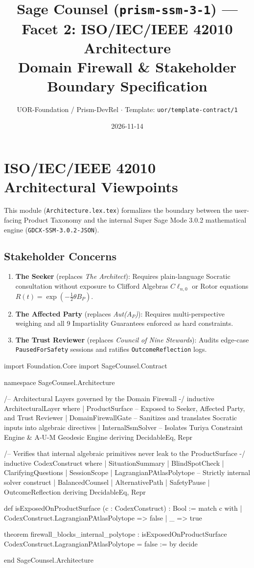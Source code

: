 \documentclass[11pt,a4paper]{article}
\title{Sage Counsel (\texttt{prism-ssm-3-1}) --- Facet 2: ISO/IEC/IEEE 42010 Architecture\\
\small Domain Firewall \& Stakeholder Boundary Specification}
\author{UOR-Foundation / Prism-DevRel $\cdot$ Template: \texttt{uor/template-contract/1}}
\date{2026-11-14}
\begin{document}
\maketitle

\section{ISO/IEC/IEEE 42010 Architectural Viewpoints}
This module (\texttt{Architecture.lex.tex}) formalizes the boundary between the user-facing Product Taxonomy and the internal Super Sage Mode 3.0.2 mathematical engine (\texttt{GDCX-SSM-3.0.2-JSON}).

\subsection{Stakeholder Concerns}
\begin{enumerate}
  \item \textbf{The Seeker} (replaces \emph{The Architect}): Requires plain-language Socratic consultation without exposure to Clifford Algebras $C\ell_{n,0}$ or Rotor equations $R(t) = \exp(-\frac{1}{2}\theta B_P)$.
  \item \textbf{The Affected Party} (replaces \emph{Aut($A_P$)}): Requires multi-perspective weighing and all 9 Impartiality Guarantees enforced as hard constraints.
  \item \textbf{The Trust Reviewer} (replaces \emph{Council of Nine Stewards}): Audits edge-case \texttt{PausedForSafety} sessions and ratifies \texttt{OutcomeReflection} logs.
\end{enumerate}

\begin{code}
import Foundation.Core
import SageCounsel.Contract

namespace SageCounsel.Architecture

/-- Architectural Layers governed by the Domain Firewall -/
inductive ArchitecturalLayer where
  | ProductSurface     -- Exposed to Seeker, Affected Party, and Trust Reviewer
  | DomainFirewallGate -- Sanitizes and translates Socratic inputs into algebraic directives
  | InternalSsmSolver  -- Isolates Turiya Constraint Engine & A-U-M Geodesic Engine
  deriving DecidableEq, Repr

/-- Verifies that internal algebraic primitives never leak to the ProductSurface -/
inductive CodexConstruct where
  | SituationSummary
  | BlindSpotCheck
  | ClarifyingQuestions
  | SessionScope
  | LagrangianPAtlasPolytope -- Strictly internal solver construct
  | BalancedCounsel
  | AlternativePath
  | SafetyPause
  | OutcomeReflection
  deriving DecidableEq, Repr

def isExposedOnProductSurface (c : CodexConstruct) : Bool :=
  match c with
  | CodexConstruct.LagrangianPAtlasPolytope => false
  | _ => true

theorem firewall_blocks_internal_polytope :
    isExposedOnProductSurface CodexConstruct.LagrangianPAtlasPolytope = false := by
  decide

end SageCounsel.Architecture
\end{code}
\end{document}
